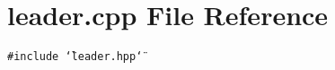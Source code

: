 \section{leader.cpp File Reference}
\label{leader_8cpp}
{\tt \#include \char`\"{}leader.hpp\char`\"{}}\par
